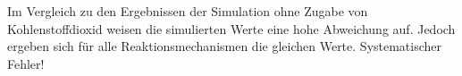 \documentclass[footmark=none]{tubaf-thesis}
\begin{document}
        Im Vergleich zu den Ergebnissen der Simulation ohne Zugabe von Kohlenstoffdioxid weisen die simulierten Werte eine hohe Abweichung auf. Jedoch ergeben sich für alle Reaktionsmechanismen die gleichen Werte. \alert{Systematischer Fehler!}
    \pagebreak
    \printbibliography[heading=bibintoc,title=Quellenverzeichnis]
\end{document}
